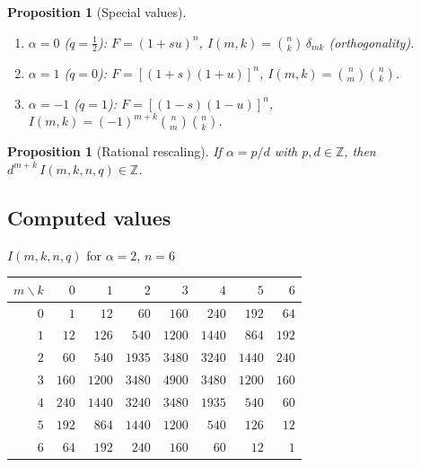 \documentclass[11pt,a4paper]{article}
\theoremstyle{plain}
\newtheorem{proposition}[theorem]{Proposition}
\theoremstyle{definition}
\begin{document}
\begin{tcolorbox}[colback=black!5, colframe=black!5, boxrule=0pt,
  sharp corners]
\begin{proposition}[Special values]\label{prop:kraw-special}
\mbox{}
\begin{enumerate}
\item $\alpha = 0$ ($q = \tfrac12$):
  $F = (1+su)^n$, $I(m,k) = \binom{n}{k}\,\delta_{mk}$
  (orthogonality).
\item $\alpha = 1$ ($q = 0$):
  $F = [(1{+}s)(1{+}u)]^n$, $I(m,k) = \binom{n}{m}\binom{n}{k}$.
\item $\alpha = -1$ ($q = 1$):
  $F = [(1{-}s)(1{-}u)]^n$,
  $I(m,k) = (-1)^{m+k}\binom{n}{m}\binom{n}{k}$.
\end{enumerate}
\end{proposition}
\end{tcolorbox}

\begin{tcolorbox}[colback=black!5, colframe=black!5, boxrule=0pt,
  sharp corners]
\begin{proposition}[Rational rescaling]\label{prop:kraw-rational}
If $\alpha = p/d$ with $p, d \in \mathbb{Z}$, then
$d^{m+k}\, I(m, k, n, q) \in \mathbb{Z}$.
\end{proposition}
\end{tcolorbox}

\subsection{Computed values}

\begin{tcolorbox}[colback=black!5, colframe=black!5, boxrule=0pt,
  sharp corners]
\begin{center}
$I(m,k,n,q)$ for $\alpha = 2$, $n = 6$

\medskip
\begin{tabular}{r|rrrrrrr}
$m \!\backslash\! k$ & $0$ & $1$ & $2$ & $3$ & $4$ & $5$ & $6$ \\
\hline
$0$ & $1$ & $12$ & $60$ & $160$ & $240$ & $192$ & $64$ \\
$1$ & $12$ & $126$ & $540$ & $1200$ & $1440$ & $864$ & $192$ \\
$2$ & $60$ & $540$ & $1935$ & $3480$ & $3240$ & $1440$ & $240$ \\
$3$ & $160$ & $1200$ & $3480$ & $4900$ & $3480$ & $1200$ & $160$ \\
$4$ & $240$ & $1440$ & $3240$ & $3480$ & $1935$ & $540$ & $60$ \\
$5$ & $192$ & $864$ & $1440$ & $1200$ & $540$ & $126$ & $12$ \\
$6$ & $64$ & $192$ & $240$ & $160$ & $60$ & $12$ & $1$ \\
\end{tabular}
\end{center}
\end{tcolorbox}
\end{document}
